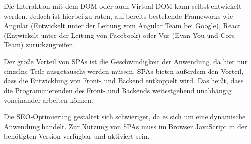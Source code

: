 Die Interaktion mit dem DOM oder auch Virtual DOM kann selbst entwickelt werden. Jedoch ist hierbei zu raten, auf bereits bestehende Frameworks wie Angular (Entwickelt unter der Leitung vom Angular Team bei Google), React (Entwickelt unter der Leitung von Facebook) oder Vue (Evan You und Core Team) zurückzugreifen. 

Der große Vorteil von SPAs ist die Geschwindigkeit der Anwendung, da hier nur einzelne Teile ausgetauscht werden müssen. SPAs bieten außerdem den Vorteil, dass die Entwicklung von Front- und Backend entkoppelt wird. Das heißt, dass die Programmierenden des Front- und Backends weitestgehend unabhängig voneinander arbeiten können.

Die SEO-Optimierung gestaltet sich schwieriger, da es sich um eine dynamische Anwendung handelt. Zur Nutzung von SPAs muss im Browser JavaScript in der benötigten Version verfügbar und aktiviert sein.

\clearpage

